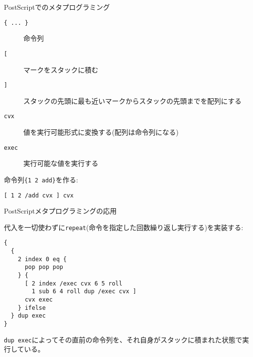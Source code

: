 \documentclass[cjk, 12pt, dvipdfm]{beamer}
\begin{document}
\begin{frame}[fragile]{PostScriptでのメタプログラミング}

 \begin{description}
  \item[\texttt{\{ ... \}}] 命令列
  \item[\texttt{[}] マークをスタックに積む
  \item[\texttt{]}] スタックの先頭に最も近いマークからスタックの先頭までを配列にする
  \item[\texttt{cvx}] 値を実行可能形式に変換する(配列は命令列になる)
  \item[\texttt{exec}] 実行可能な値を実行する
 \end{description}

 命令列\texttt{\{1 2 add\}}を作る:

\begin{lstlisting}[style=postscript]
[ 1 2 /add cvx ] cvx
\end{lstlisting}

\end{frame}

\begin{frame}[fragile]{PostScriptメタプログラミングの応用}

 代入を一切使わずに\texttt{repeat}(命令を指定した回数繰り返し実行する)を実装する:

\begin{lstlisting}[style=postscript]
{
  {
    2 index 0 eq {
      pop pop pop
    } {
      [ 2 index /exec cvx 6 5 roll
        1 sub 6 4 roll dup /exec cvx ]
      cvx exec
    } ifelse
  } dup exec
}
\end{lstlisting}

 \texttt{dup exec}によってその直前の命令列を、それ自身がスタックに積まれた状態で実行している。

\end{frame}
\end{document}
